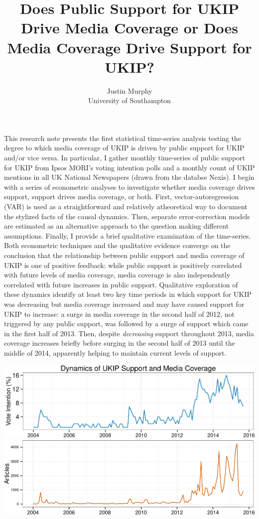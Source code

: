 \documentclass[12pt,article]{article}
\title{Does Public Support for UKIP Drive Media Coverage or Does Media Coverage
Drive Support for UKIP?}
\author{Justin Murphy\\University of Southampton}
\date{}
\begin{document}
\maketitle


This research note presents the first statistical time-series analysis
testing the degree to which media coverage of UKIP is driven by public
support for UKIP and/or vice versa. In particular, I gather monthly
time-series of public support for UKIP from Ipsos MORI's voting
intention polls and a monthly count of UKIP mentions in all UK National
Newspapers (drawn from the databse Nexis). I begin with a series of
econometric analyses to investigate whether media coverage drives
support, support drives media coverage, or both. First,
vector-autoregression (VAR) is used as a straightforward and relatively
atheoretical way to document the stylized facts of the causal dynamics.
Then, separate error-correction models are estimated as an alternative
approach to the question making different assumptions. Finally, I
provide a brief qualitative examination of the time-series. Both
econometric techniques and the qualitative evidence converge on the
conclusion that the relationship between public support and media
coverage of UKIP is one of positive feedback: while public support is
positively correlated with future levels of media coverage, media
coverage is also independently correlated with future increases in
public support. Qualitative exploration of these dynamics identify at
least two key time periods in which support for UKIP was decreasing but
media coverage increased and may have caused support for UKIP to
increase: a surge in media coverage in the second half of 2012, not
triggered by any public support, was followed by a surge of support
which came in the first half of 2013. Then, despite \emph{decreasing}
support throughout 2013, media coverage increases briefly before surging
in the second half of 2013 until the middle of 2014, apparently helping
to maintain current levels of support.

\pagebreak

\includegraphics{ukip_media_files/figure-latex/unnamed-chunk-11.pdf}
\includegraphics{ukip_media_files/figure-latex/unnamed-chunk-12.pdf}
\end{document}
